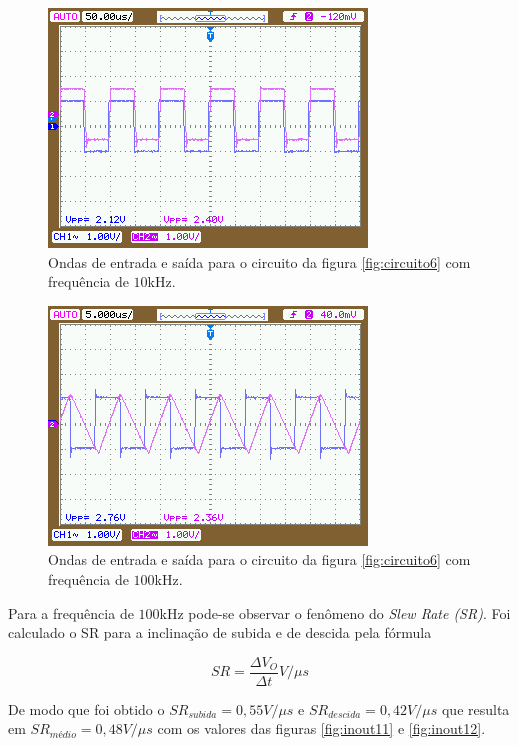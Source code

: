 \documentclass{abntex2}
\begin{document}
\begin{figure}[h]
  \centering
  \includegraphics[scale = 0.5]{NewFile9.png}
  \caption{Ondas de entrada e saída para o circuito da figura \ref{fig:circuito6} com frequência de $10$kHz.}
  \label{fig:inout9}
\end{figure}

\begin{figure}[h]
  \centering
  \includegraphics[scale = 0.5]{NewFile10.png}
  \caption{Ondas de entrada e saída para o circuito da figura \ref{fig:circuito6} com frequência de $100$kHz.}
  \label{fig:inout10}
\end{figure}

Para a frequência de $100$kHz pode-se observar o fenômeno do \emph{Slew Rate (SR)}. Foi calculado o SR para a inclinação de subida e de descida pela fórmula

\[{SR} = \frac{\Delta V_O}{\Delta t} V/\mu s\]

De modo que foi obtido o ${SR}_{subida} = 0,55V/\mu s$ e ${SR}_{descida} = 0,42V/\mu s$ que resulta em ${SR}_{médio} = 0,48V/\mu s$ com os valores das figuras \ref{fig:inout11} e \ref{fig:inout12}.
\end{document}
